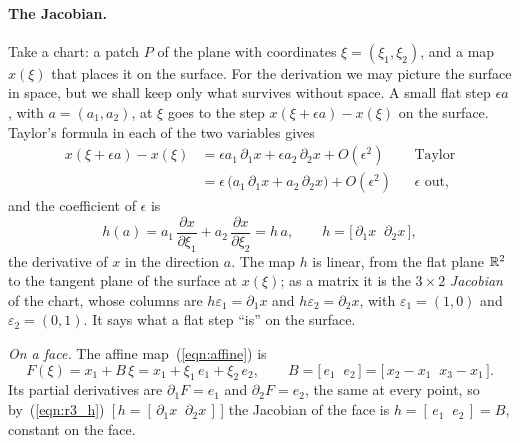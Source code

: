 \paragraph{The Jacobian.} Take a chart: a patch $P$ of the plane with coordinates $\xi = (\xi_1, \xi_2)$, and a map $x(\xi)$ that places it on the surface. For the derivation we may picture the surface in space, but we shall keep only what survives without space. A small flat step $\epsilon a$, with $a = (a_1, a_2)$, at $\xi$ goes to the step $x(\xi + \epsilon a) - x(\xi)$ on the surface. Taylor's formula in each of the two variables gives
\begin{align*}
x(\xi + \epsilon a) - x(\xi) &= \epsilon a_1\, \partial_1 x + \epsilon a_2\, \partial_2 x + O(\epsilon^2) && \text{Taylor} \\
&= \epsilon\, \big(a_1\, \partial_1 x + a_2\, \partial_2 x\big) + O(\epsilon^2) && \text{$\epsilon$ out,}
\end{align*}
and the coefficient of $\epsilon$ is
\begin{equation}
\label{eqn:r3_h}
h(a) = a_1\, \frac{\partial x}{\partial \xi_1} + a_2\, \frac{\partial x}{\partial \xi_2} = h\, a, \qquad h = \big[\,\partial_1 x \;\; \partial_2 x\,\big] ,
\end{equation}
the derivative of $x$ in the direction $a$. The map $h$ is linear, from the flat plane $\mathbb{R}^2$ to the tangent plane of the surface at $x(\xi)$; as a matrix it is the $3 \times 2$ \emph{Jacobian} of the chart, whose columns are $h\varepsilon_1 = \partial_1 x$ and $h\varepsilon_2 = \partial_2 x$, with $\varepsilon_1 = (1, 0)$ and $\varepsilon_2 = (0, 1)$. It says what a flat step ``is'' on the surface.

\emph{On a face.} The affine map~(\ref{eqn:affine}) is
\begin{equation*}
F(\xi) = x_1 + B\,\xi = x_1 + \xi_1\, e_1 + \xi_2\, e_2, \qquad B = \big[\, e_1 \;\; e_2 \,\big] = \big[\, x_2 - x_1 \;\; x_3 - x_1 \,\big] .
\end{equation*}
Its partial derivatives are $\partial_1 F = e_1$ and $\partial_2 F = e_2$, the same at every point, so by~(\ref{eqn:r3_h})~[\,$h = [\,\partial_1x \;\; \partial_2x\,]$\,] the Jacobian of the face is $h = [\,e_1 \;\; e_2\,] = B$, constant on the face.

